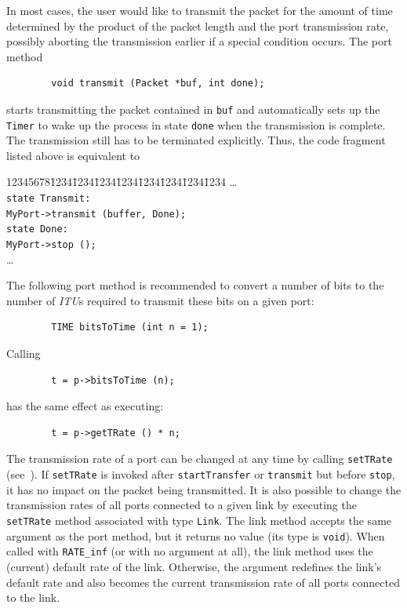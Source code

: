 In most cases, the user would like to transmit the packet
for the amount of time determined by the product of the packet length and
the port transmission rate, possibly aborting the transmission earlier if a
special condition occurs.
The port method
\begin{verbatim}
        void transmit (Packet *buf, int done);
\end{verbatim}
starts transmitting the packet contained in {\tt buf} and automatically
sets up the {\tt Timer} to wake up the process in state {\tt done} when the
transmission is complete.
The transmission still has to be terminated explicitly.
Thus, the code fragment listed above is equivalent to
{\tt\begin{tabbing}
12345678\=1234\=1234\=1234\=1234\=1234\=1234\=1234\=1234\kill
\> \ldots \\
\> {\tt state Transmit:}\\
\> \> {\tt MyPort->transmit (buffer, Done);}\\
\> {\tt state Done:}\\
\> \> {\tt MyPort->stop ();}\\
\> \>\ldots
\end{tabbing}}

The following port method is recommended
to convert a number of bits to the number of {\em ITU\/}s
required to transmit these bits on a given port:
\begin{verbatim}
        TIME bitsToTime (int n = 1);
\end{verbatim}
Calling
\begin{verbatim}
        t = p->bitsToTime (n);
\end{verbatim}
has the same effect as executing:
\begin{verbatim}
        t = p->getTRate () * n;
\end{verbatim}

\medskip

The transmission rate of a port can be changed at any time
by calling {\tt setTRate} (see~).
If {\tt setTRate} is invoked after {\tt startTransfer} or {\tt transmit} but
before {\tt stop}, it has no impact on the packet being transmitted.
It is also possible to change the transmission rates of all ports connected
to a given link by executing the {\tt setTRate} method associated with type
{\tt Link}.
The link method accepts the same argument as the port method,
but it returns no value (its type is {\tt void}).
When called with {\tt RATE\_inf} (or with no argument at all),
the link method uses the (current) default rate of the link.
Otherwise, the argument redefines the link's default rate and also becomes the
current transmission rate of all ports connected to the link.

